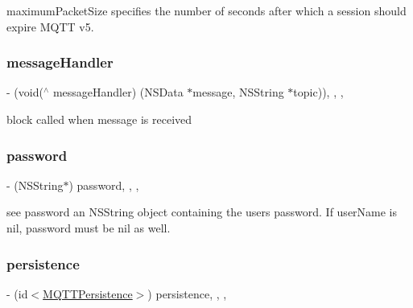 maximum\+Packet\+Size specifies the number of seconds after which a session should expire M\+Q\+TT v5. \mbox{\label{interface_m_q_t_t_session_a0af8d5512fae0ed59e572e9566ac9940}} 
\subsubsection{\texorpdfstring{message\+Handler}{messageHandler}}
{\footnotesize\ttfamily -\/ (void($^\wedge$ message\+Handler) (N\+S\+Data $\ast$message, N\+S\+String $\ast$topic))\hspace{0.3cm}{\ttfamily [read]}, {\ttfamily [write]}, {\ttfamily [atomic]}, {\ttfamily [strong]}}

block called when message is received \mbox{\label{interface_m_q_t_t_session_a5c0d3fc1c8fbdcb39ba7c7cff8d43a5b}} 
\subsubsection{\texorpdfstring{password}{password}}
{\footnotesize\ttfamily -\/ (N\+S\+String$\ast$) password\hspace{0.3cm}{\ttfamily [read]}, {\ttfamily [write]}, {\ttfamily [nonatomic]}, {\ttfamily [strong]}}

see password an N\+S\+String object containing the user\textquotesingle{}s password. If user\+Name is nil, password must be nil as well. \mbox{\label{interface_m_q_t_t_session_ae97bbef7489e0eb1f3bbbc93b02b6f41}} 
\subsubsection{\texorpdfstring{persistence}{persistence}}
{\footnotesize\ttfamily -\/ (id$<$\hyperlink{protocol_m_q_t_t_persistence-p}{M\+Q\+T\+T\+Persistence}$>$) persistence\hspace{0.3cm}{\ttfamily [read]}, {\ttfamily [write]}, {\ttfamily [nonatomic]}, {\ttfamily [strong]}}

